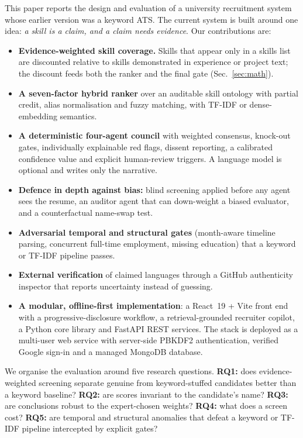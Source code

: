 \documentclass[conference]{IEEEtran}
\begin{document}
This paper reports the design and evaluation of a university recruitment system whose earlier version was a keyword ATS. The current system is built around one idea: \emph{a skill is a claim, and a claim needs evidence}. Our contributions are:
\begin{itemize}
\item \textbf{Evidence-weighted skill coverage.} Skills that appear only in a skills list are discounted relative to skills demonstrated in experience or project text; the discount feeds both the ranker and the final gate (Sec.~\ref{sec:math}).
\item \textbf{A seven-factor hybrid ranker} over an auditable skill ontology with partial credit, alias normalisation and fuzzy matching, with TF-IDF or dense-embedding semantics.
\item \textbf{A deterministic four-agent council} with weighted consensus, knock-out gates, individually explainable red flags, dissent reporting, a calibrated confidence value and explicit human-review triggers. A language model is optional and writes only the narrative.
\item \textbf{Defence in depth against bias:} blind screening applied before any agent sees the resume, an auditor agent that can down-weight a biased evaluator, and a counterfactual name-swap test.
\item \textbf{Adversarial temporal and structural gates} (month-aware timeline parsing, concurrent full-time employment, missing education) that a keyword or TF-IDF pipeline passes.
\item \textbf{External verification} of claimed languages through a GitHub authenticity inspector that reports uncertainty instead of guessing.
\item \textbf{A modular, offline-first implementation}: a React~19 + Vite front end with a progressive-disclosure workflow, a retrieval-grounded recruiter copilot, a Python core library and FastAPI REST services. The stack is deployed as a multi-user web service with server-side PBKDF2 authentication, verified Google sign-in and a managed MongoDB database.
\end{itemize}

We organise the evaluation around five research questions. \textbf{RQ1:} does evidence-weighted screening separate genuine from keyword-stuffed candidates better than a keyword baseline? \textbf{RQ2:} are scores invariant to the candidate's name? \textbf{RQ3:} are conclusions robust to the expert-chosen weights? \textbf{RQ4:} what does a screen cost? \textbf{RQ5:} are temporal and structural anomalies that defeat a keyword or TF-IDF pipeline intercepted by explicit gates?
\end{document}
